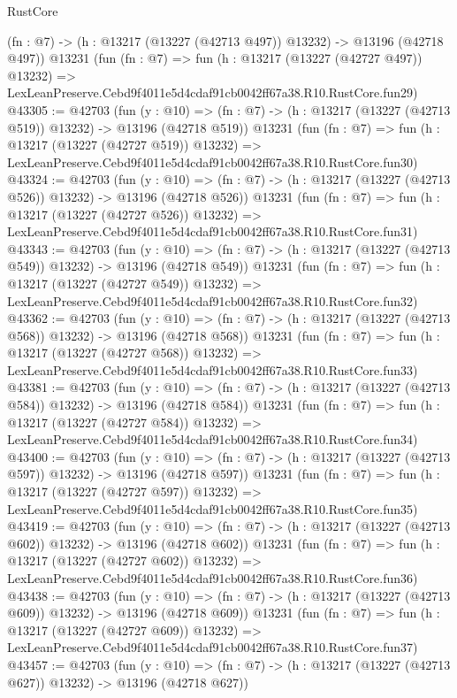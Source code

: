 \begin{lexlean}{RustCore}
\begin{coremodule}
    (fn : @7) -> (h : @13217 (@13227 (@42713 @497)) @13232) -> @13196 (@42718 @497))
    @13231
    (fun (fn : @7) =>
    fun (h : @13217 (@13227 (@42727 @497)) @13232) =>
    LexLeanPreserve.Cebd9f4011e5d4cdaf91cb0042ff67a38.R10.RustCore.fun29)
@43305 := @42703
    (fun (y : @10) =>
    (fn : @7) -> (h : @13217 (@13227 (@42713 @519)) @13232) -> @13196 (@42718 @519))
    @13231
    (fun (fn : @7) =>
    fun (h : @13217 (@13227 (@42727 @519)) @13232) =>
    LexLeanPreserve.Cebd9f4011e5d4cdaf91cb0042ff67a38.R10.RustCore.fun30)
@43324 := @42703
    (fun (y : @10) =>
    (fn : @7) -> (h : @13217 (@13227 (@42713 @526)) @13232) -> @13196 (@42718 @526))
    @13231
    (fun (fn : @7) =>
    fun (h : @13217 (@13227 (@42727 @526)) @13232) =>
    LexLeanPreserve.Cebd9f4011e5d4cdaf91cb0042ff67a38.R10.RustCore.fun31)
@43343 := @42703
    (fun (y : @10) =>
    (fn : @7) -> (h : @13217 (@13227 (@42713 @549)) @13232) -> @13196 (@42718 @549))
    @13231
    (fun (fn : @7) =>
    fun (h : @13217 (@13227 (@42727 @549)) @13232) =>
    LexLeanPreserve.Cebd9f4011e5d4cdaf91cb0042ff67a38.R10.RustCore.fun32)
@43362 := @42703
    (fun (y : @10) =>
    (fn : @7) -> (h : @13217 (@13227 (@42713 @568)) @13232) -> @13196 (@42718 @568))
    @13231
    (fun (fn : @7) =>
    fun (h : @13217 (@13227 (@42727 @568)) @13232) =>
    LexLeanPreserve.Cebd9f4011e5d4cdaf91cb0042ff67a38.R10.RustCore.fun33)
@43381 := @42703
    (fun (y : @10) =>
    (fn : @7) -> (h : @13217 (@13227 (@42713 @584)) @13232) -> @13196 (@42718 @584))
    @13231
    (fun (fn : @7) =>
    fun (h : @13217 (@13227 (@42727 @584)) @13232) =>
    LexLeanPreserve.Cebd9f4011e5d4cdaf91cb0042ff67a38.R10.RustCore.fun34)
@43400 := @42703
    (fun (y : @10) =>
    (fn : @7) -> (h : @13217 (@13227 (@42713 @597)) @13232) -> @13196 (@42718 @597))
    @13231
    (fun (fn : @7) =>
    fun (h : @13217 (@13227 (@42727 @597)) @13232) =>
    LexLeanPreserve.Cebd9f4011e5d4cdaf91cb0042ff67a38.R10.RustCore.fun35)
@43419 := @42703
    (fun (y : @10) =>
    (fn : @7) -> (h : @13217 (@13227 (@42713 @602)) @13232) -> @13196 (@42718 @602))
    @13231
    (fun (fn : @7) =>
    fun (h : @13217 (@13227 (@42727 @602)) @13232) =>
    LexLeanPreserve.Cebd9f4011e5d4cdaf91cb0042ff67a38.R10.RustCore.fun36)
@43438 := @42703
    (fun (y : @10) =>
    (fn : @7) -> (h : @13217 (@13227 (@42713 @609)) @13232) -> @13196 (@42718 @609))
    @13231
    (fun (fn : @7) =>
    fun (h : @13217 (@13227 (@42727 @609)) @13232) =>
    LexLeanPreserve.Cebd9f4011e5d4cdaf91cb0042ff67a38.R10.RustCore.fun37)
@43457 := @42703
    (fun (y : @10) =>
    (fn : @7) -> (h : @13217 (@13227 (@42713 @627)) @13232) -> @13196 (@42718 @627))

\end{coremodule}
\end{lexlean}
